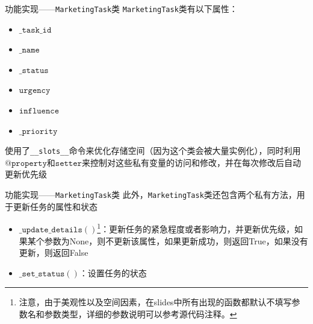 \documentclass[aspectratio=169]{beamer}
\begin{document}
\begin{frame}{功能实现——\texttt{MarketingTask}类}
    \texttt{MarketingTask}类有以下属性：
    \begin{itemize}
        \item $\mathtt{\_task\_id}$
        \item $\mathtt{\_name}$
        \item $\mathtt{\_status}$
        \item $\mathtt{urgency}$
        \item $\mathtt{influence}$
        \item $\mathtt{\_priority}$
    \end{itemize}
    使用了\texttt{\_\_slots\_\_}命令来优化存储空间（因为这个类会被大量实例化），同时利用$\mathtt{@property}$和$\mathtt{setter}$来控制对这些私有变量的访问和修改，并在每次修改后自动更新优先级
\end{frame}

\begin{frame}{功能实现——\texttt{MarketingTask}类}
    此外，\texttt{MarketingTask}类还包含两个私有方法，用于更新任务的属性和状态
    \begin{itemize}
    \item $\mathtt{\_update\_details()}$\footnote{注意，由于美观性以及空间因素，在slides中所有出现的函数都默认不填写参数名和参数类型，详细的参数说明可以参考源代码注释。}：更新任务的紧急程度或者影响力，并更新优先级，如果某个参数为None，则不更新该属性，如果更新成功，则返回True，如果没有更新，则返回False
    \item $\mathtt{\_set\_status()}$：设置任务的状态
    \end{itemize}
\end{frame}
\end{document}
